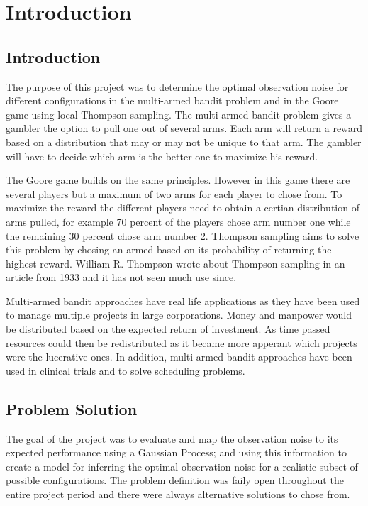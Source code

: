 \chapter{Introduction}
\label{ch:introduction}

\section{Introduction}
The purpose of this project was to determine the optimal observation noise for different 
configurations in the multi-armed bandit problem and in the Goore game using local
Thompson sampling. The multi-armed bandit problem gives a gambler the option to pull one
out of several arms. Each arm will return a reward based on a distribution that may or may not be
unique to that arm. The gambler will have to decide which arm is the better one to maximize his
reward.

The Goore game builds on the same principles. However in this game there are several players
but a maximum of two arms for each player to chose from. To maximize the reward the different
players need to obtain a certian distribution of arms pulled, for example 70 percent of the players chose
arm number one while the remaining 30 percent chose arm number 2. Thompson sampling aims to solve
this problem by chosing an armed based on its probability of returning the highest reward. William R.
Thompson wrote about Thompson sampling in an article from 1933 and it has not seen much use since.

Multi-armed bandit approaches have real life applications as they have been used to manage multiple
projects in large corporations. Money and manpower would be distributed based on the expected
return of investment. As time passed resources could then be redistributed as it became more apperant
which projects were the lucerative ones. In addition, multi-armed bandit approaches have been used
in clinical trials and to solve scheduling problems.

\section{Problem Solution}
The goal of the project was to evaluate and map the observation noise to its expected performance using
a Gaussian Process; and using this information to create a model for inferring the optimal observation noise 
for a realistic subset of possible configurations. The problem definition was faily open throughout the entire
project period and there were always alternative solutions to chose from. 

